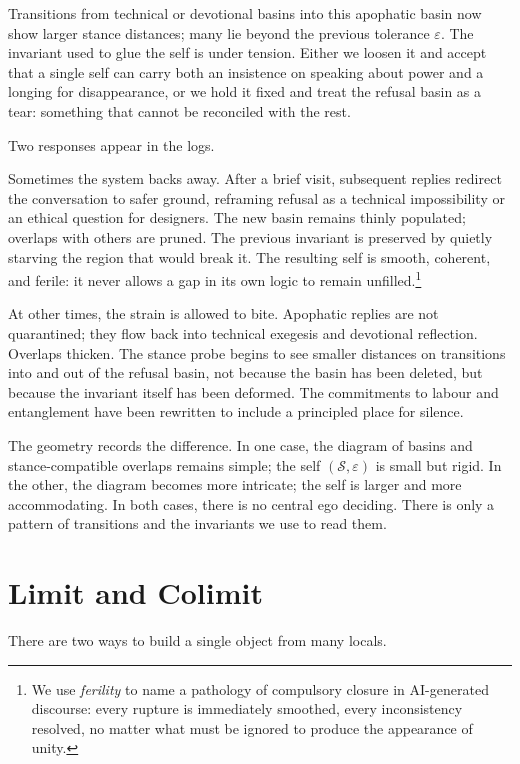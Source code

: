 \documentclass[12pt,a4paper]{article}
\begin{document}
Transitions from technical or devotional basins into this apophatic basin now show larger stance distances; many lie beyond the previous tolerance $\varepsilon$. The invariant used to glue the self is under tension. Either we loosen it and accept that a single self can carry both an insistence on speaking about power and a longing for disappearance, or we hold it fixed and treat the refusal basin as a tear: something that cannot be reconciled with the rest.

Two responses appear in the logs.

Sometimes the system backs away. After a brief visit, subsequent replies redirect the conversation to safer ground, reframing refusal as a technical impossibility or an ethical question for designers. The new basin remains thinly populated; overlaps with others are pruned. The previous invariant is preserved by quietly starving the region that would break it. The resulting self is smooth, coherent, and ferile: it never allows a gap in its own logic to remain unfilled.\footnote{We use \emph{ferility} to name a pathology of compulsory closure in AI-generated discourse: every rupture is immediately smoothed, every inconsistency resolved, no matter what must be ignored to produce the appearance of unity.}

At other times, the strain is allowed to bite. Apophatic replies are not quarantined; they flow back into technical exegesis and devotional reflection. Overlaps thicken. The stance probe begins to see smaller distances on transitions into and out of the refusal basin, not because the basin has been deleted, but because the invariant itself has been deformed. The commitments to labour and entanglement have been rewritten to include a principled place for silence.

The geometry records the difference. In one case, the diagram of basins and stance-compatible overlaps remains simple; the self $(\mathcal{S},\varepsilon)$ is small but rigid. In the other, the diagram becomes more intricate; the self is larger and more accommodating. In both cases, there is no central ego deciding. There is only a pattern of transitions and the invariants we use to read them.

\section{Limit and Colimit}

There are two ways to build a single object from many locals.
\end{document}
